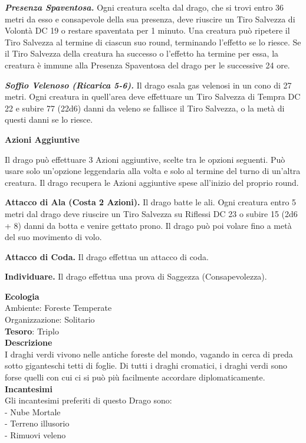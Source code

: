 \begin{multicols}{2}
	\textit{\textbf{Presenza Spaventosa.}} Ogni creatura scelta dal drago, che si trovi entro 36 metri da esso e consapevole della sua presenza, deve riuscire un Tiro Salvezza di Volontà DC 19 o restare spaventata per 1 minuto. Una creatura può ripetere il Tiro Salvezza al termine di ciascun suo round, terminando l'effetto se lo riesce. Se il Tiro Salvezza della creatura ha successo o l'effetto ha termine per essa, la creatura è immune alla Presenza Spaventosa del drago per le successive 24 ore.

	\textit{\textbf{Soffio Velenoso (Ricarica 5-6).}} Il drago esala gas velenosi in un cono di 27 metri. Ogni creatura in quell'area deve effettuare un Tiro Salvezza di Tempra DC 22 e subire 77 (22d6) danni da veleno se fallisce il Tiro Salvezza, o la metà di questi danni se lo riesce.

	\textbf{Azioni Aggiuntive}

	Il drago può effettuare 3 Azioni aggiuntive, scelte tra le opzioni seguenti. Può usare solo un'opzione leggendaria alla volta e solo al termine del turno di un'altra creatura. Il drago recupera le Azioni aggiuntive spese all'inizio del proprio round.

	\textbf{Attacco di Ala (Costa 2 Azioni).} Il drago batte le ali. Ogni creatura entro 5 metri dal drago deve riuscire un Tiro Salvezza su Riflessi DC 23 o subire 15 (2d6 + 8) danni da botta e venire gettato prono. Il drago può poi volare fino a metà del suo movimento di volo.

	\textbf{Attacco di Coda.} Il drago effettua un attacco di coda.

	\textbf{Individuare.} Il drago effettua una prova di Saggezza (Consapevolezza).

	\textbf{Ecologia}\\
	Ambiente: Foreste Temperate\\
	Organizzazione: Solitario\\
	\textbf{Tesoro}: Triplo\\
	\textbf{Descrizione}\\
	I draghi verdi vivono nelle antiche foreste del mondo, vagando in cerca di preda sotto giganteschi tetti di foglie. Di tutti i draghi cromatici, i draghi verdi sono forse quelli con cui ci si può più facilmente accordare diplomaticamente.\\
	\textbf{Incantesimi}\\
	Gli incantesimi preferiti di questo Drago sono:\\
	- Nube Mortale\\
	- Terreno illusorio\\
	- Rimuovi veleno



\end{multicols}
